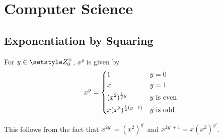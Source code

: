 \section{Computer Science}

\subsection{Exponentiation by Squaring} \label{sec_exp_by_squaring}


For \(y \in \Integers_0^+\), \(x^y\) is given by
\begin{equation*}
 x^y =
  \begin{dcases}
   1 & y = 0 \\
   x & y = 1 \\
   (x^2)^{\frac 12 y} & \text{\(y\) is even} \\
   x(x^2)^{\frac 12 (y - 1)} & \text{\(y\) is odd} \\
  \end{dcases}
\end{equation*}

This follows from the fact that
\(x^{2y'} = (x^2)^{y'}\) and \(x^{2y' + 1} = x(x^2)^{y'}\).
